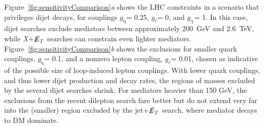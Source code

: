 \documentclass{ar-1col}
\newcommand{\chiDM}{\ensuremath{\chi}\xspace}
\newcommand{\gDM}{\ensuremath{g_{\chiDM}}\xspace}
\newcommand{\gdm}{\gDM}
\newcommand{\gl}{$g_{\ell}$\xspace}
\newcommand{\gq}{$g_{\mathrm{q}}$\xspace}
\newcommand{\MET}{\ensuremath{\slashed{E}_T}\xspace}
\begin{document}
{Figure~\ref{fig:sensitivityComparison}\textit{a} shows the LHC constraints
in a scenario that privileges dijet decays, for couplings
\gq = 0.25, \gl = 0, and \gdm = 1. 
In this case, dijet searches exclude
mediators between approximately 200~GeV and 2.6~TeV, while \textit{X}+\MET searches
can constrain even lighter mediators. 
Figure~\ref{fig:sensitivityComparison}\textit{b} shows the
exclusions for smaller quark couplings, \gq = 0.1, and a nonzero
lepton coupling, \gl = 0.01, chosen as indicative of the possible
size of loop-induced lepton couplings. With lower quark couplings,
and thus lower dijet production and decay rates, the regions of
masses excluded by the several dijet searches shrink. For
mediators heavier than 150 GeV, the exclusions from the recent
dilepton search fare better but do not extend very far into the
(smaller) region excluded by the jet+\MET search, where mediator
decays to DM dominate.

}
\end{document}
